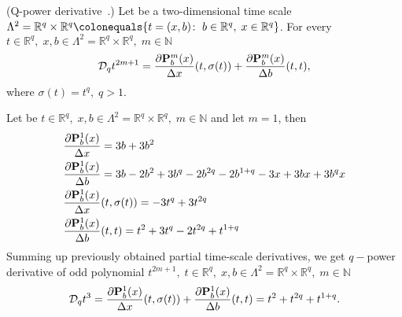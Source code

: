 \begin{cor}
    \label{q_power_derivative_case}
    (Q-power derivative~\cite{aldwoah2011power}.)
    Let be a two-dimensional time scale
    $\Lambda^2 = {\mathbb{R}}^{q} \times {\mathbb{R}}^{q} \colonequals \{t=(x,b) \colon \; b\in {\mathbb{R}}^{q}, \; x\in{\mathbb{R}}^{q} \}$.
    For every $t\in {\mathbb{R}}^{q}, \; x,b\in\Lambda^2 = {\mathbb{R}}^{q} \times {\mathbb{R}}^{q}, \; m\in\mathbb{N}$
    \[
        \mathcal{D}_q t^{2m+1}
        = \frac{\partial {\mathbf{P}}\sp{m} \sb{b}(x)}{\Delta x}(t, \sigma(t))
        + \frac{\partial {\mathbf{P}}\sp{m} \sb{b}(x)}{\Delta b}(t, t),
    \]
    where $\sigma(t) = t^q, \; q > 1$.
\end{cor}
\begin{examp}
    Let be $t\in {\mathbb{R}}^{q}, \; x,b\in\Lambda^2 = {\mathbb{R}}^{q} \times {\mathbb{R}}^{q}, \; m\in\mathbb{N}$
    and let $m=1$, then
    \begin{align*}
        &\frac{\partial {\mathbf{P}}\sp{1} \sb{b}(x)}{\Delta x} = 3 b + 3 b^2 \\
        &\frac{\partial {\mathbf{P}}\sp{1} \sb{b}(x)}{\Delta b} = 3 b - 2 b^2 + 3 b^q - 2 b^{2 q} - 2 b^{1 + q} - 3 x + 3 b x + 3 b^q x \\
        &\frac{\partial {\mathbf{P}}\sp{1} \sb{b}(x)}{\Delta x}(t, \sigma(t)) = -3 t^q + 3 t^{2 q} \\
        &\frac{\partial {\mathbf{P}}\sp{1} \sb{b}(x)}{\Delta b}(t, t) = t^2 + 3 t^q - 2 t^{2 q} + t^{1 + q}
    \end{align*}
    Summing up previously obtained partial time-scale derivatives, we get $q-$power derivative of odd polynomial
    $t^{2m+1}, \; t\in {\mathbb{R}}^{q}, \; x,b\in\Lambda^2 = {\mathbb{R}}^{q} \times {\mathbb{R}}^{q}, \; m\in\mathbb{N}$
    \[
        \mathcal{D}_q t^{3}
        = \frac{\partial {\mathbf{P}}\sp{1} \sb{b}(x)}{\Delta x}(t, \sigma(t)) + \frac{\partial {\mathbf{P}}\sp{1} \sb{b}(x)}{\Delta b}(t, t)
        = t^2 + t^{2 q} + t^{1 + q}.
    \]
\end{examp}
